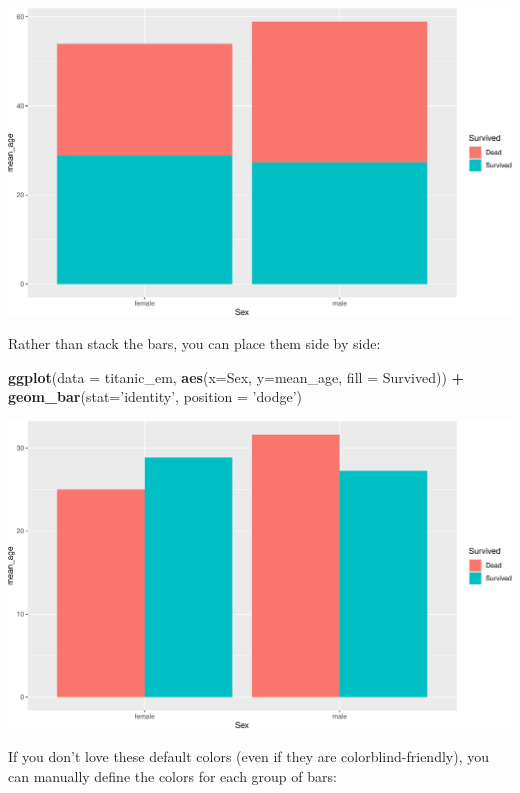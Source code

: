 \documentclass[]{book}
\newenvironment{Shaded}{\begin{snugshade}}{\end{snugshade}}
\newcommand{\DataTypeTok}[1]{\textcolor[rgb]{0.13,0.29,0.53}{#1}}
\newcommand{\KeywordTok}[1]{\textcolor[rgb]{0.13,0.29,0.53}{\textbf{#1}}}
\newcommand{\NormalTok}[1]{#1}
\newcommand{\OperatorTok}[1]{\textcolor[rgb]{0.81,0.36,0.00}{\textbf{#1}}}
\newcommand{\StringTok}[1]{\textcolor[rgb]{0.31,0.60,0.02}{#1}}
\begin{document}
\includegraphics{figures/unnamed-chunk-260-1.pdf}

Rather than stack the bars, you can place them side by side:

\begin{Shaded}
\begin{Highlighting}[]
\KeywordTok{ggplot}\NormalTok{(}\DataTypeTok{data =}\NormalTok{ titanic_em, }
       \KeywordTok{aes}\NormalTok{(}\DataTypeTok{x=}\NormalTok{Sex, }\DataTypeTok{y=}\NormalTok{mean_age, }\DataTypeTok{fill =}\NormalTok{ Survived)) }\OperatorTok{+}
\StringTok{  }\KeywordTok{geom_bar}\NormalTok{(}\DataTypeTok{stat=}\StringTok{'identity'}\NormalTok{, }\DataTypeTok{position =} \StringTok{'dodge'}\NormalTok{) }
\end{Highlighting}
\end{Shaded}

\includegraphics{figures/unnamed-chunk-261-1.pdf}

If you don't love these default colors (even if they are colorblind-friendly), you can manually define the colors for each group of bars:
\end{document}
